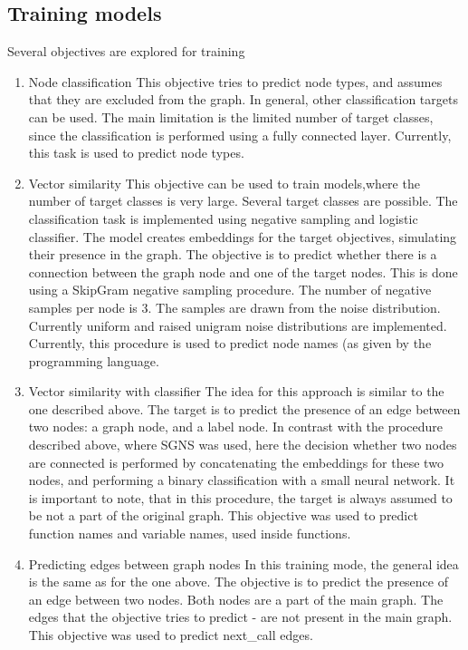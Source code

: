 \documentclass[a4paper,twoside]{article}
\begin{document}
\subsection{Training models}

Several objectives are explored for training 
\begin{enumerate}
    \item Node classification
    This objective tries to predict node types, and assumes that they are excluded from the graph. In general, other classification targets can be used. The main limitation is the limited number of target classes, since the classification is performed using a fully connected layer. Currently, this task is used to predict node types. 
    \item Vector similarity
    This objective can be used to train models,where the number of target classes is very large. Several target classes are possible. The classification task is implemented using negative sampling and logistic classifier. The model creates embeddings for the target objectives, simulating their presence in the graph. The objective is to predict whether there is a connection between the graph node and one of the target nodes. This is done using a SkipGram negative sampling procedure. The number of negative samples per node is 3. The samples are drawn from the noise distribution. Currently uniform and raised unigram noise distributions are implemented. Currently, this procedure is used to predict node names (as given by the programming language. 
    \item Vector similarity with classifier
    The idea for this approach is similar to the one described above. The target is to predict the presence of an edge between two nodes: a graph node, and a label node. In contrast with the procedure described above, where SGNS was used, here the decision whether two nodes are connected is performed by concatenating the embeddings for these two nodes, and performing a binary classification with a small neural network. It is important to note, that in this procedure, the target is always assumed to be not a part of the original graph. This objective was used to predict function names and variable names, used inside functions.
    \item Predicting edges between graph nodes
    In this training mode, the general idea is the same as for the one above. The objective is to predict the presence of an edge between two nodes. Both nodes are a part of the main graph. The edges that the objective tries to predict - are not present in the main graph. This objective was used to predict next\_call edges.
\end{enumerate}
\end{document}
